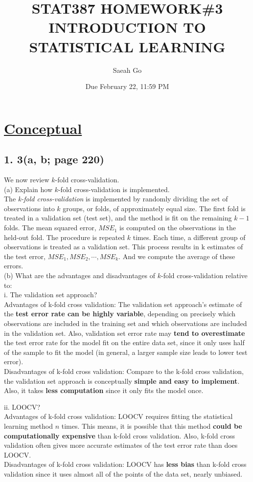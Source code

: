 \documentclass{article}
\title{STAT387 HOMEWORK\#3 \linebreak \linebreak
\large INTRODUCTION TO STATISTICAL LEARNING}
\author{Saeah Go}
\date{Due February 22, 11:59 PM}
\begin{document}
\maketitle

\section*{{\underline{Conceptual}}}
\subsection*{1. 3(a, b; page 220)}
We now review $k$-fold cross-validation. \\
(a) Explain how $k$-fold cross-validation is implemented. \\
\indent The \textit{k-fold cross-validation} is implemented by randomly dividing the set of observations into $k$ groups, or folds, of approximately equal size. The first fold is treated in a validation set (test set), and the method is fit on the remaining $k-1$ folds. The mean squared error, $MSE_1$ is computed on the observations in the held-out fold. The procedure is repeated $k$ times. Each time, a different group of observations is treated as a validation set. This process results in k estimates of the test error, $MSE_1, MSE_2, \cdots, MSE_k$. And we compute the average of these errors. \\
(b) What are the advantages and disadvantages of $k$-fold cross-validation relative to: \\
\indent\indent i. The validation set approach? \\
\indent\indent\indent Advantages of k-fold cross validation: The validation set approach's estimate of the \textbf{test error rate can be highly variable}, depending on precisely which observations are included in the training set and which observations are included in the validation set. Also, validation set error rate may \textbf{tend to overestimate} the test error rate for the model fit on the entire data set, since it only uses half of the sample to fit the model (in general, a larger sample size leads to lower test error). \\
\indent\indent\indent Disadvantages of k-fold cross validation: Compare to the k-fold cross validation, the validation set approach is conceptually \textbf{simple and easy to implement}. Also, it takes \textbf{less computation} since it only fits the model once.

\indent\indent ii. LOOCV? \\
\indent\indent\indent Advantages of k-fold cross validation: LOOCV requires fitting the statistical learning method $n$ times. This means, it is possible that this method \textbf{could be computationally expensive} than k-fold cross validation. Also, k-fold cross validation often gives more accurate estimates of the test error rate than does LOOCV. \\ %
\indent\indent\indent Disadvantages of k-fold cross validation: LOOCV has \textbf{less bias} than k-fold cross validation since it uses almost all of the points of the data set, nearly unbiased.
\end{document}

